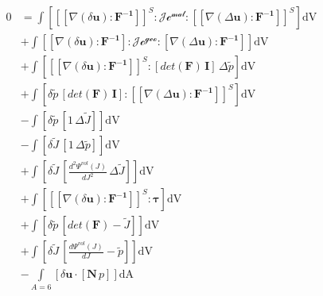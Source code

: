 \documentclass[preview,varwidth,multi,border=1pt]{standalone}
\begin{document}
\preview
$\begin{aligned}
0 &= \int\left[\left[\left[\nabla\left(\delta{\mathbf{u}}\right) \colon \mathbf{\mathbf{F}^{-1}}\right]\right]^{S} \colon \mathcal{J\mathcal{c}^{mat}} \colon \left[\left[\nabla\left(\Delta{\mathbf{u}}\right) \colon \mathbf{\mathbf{F}^{-1}}\right]\right]^{S}\right]\textrm{dV} \\
  &+ \int\left[\left[\nabla\left(\delta{\mathbf{u}}\right) \colon \mathbf{\mathbf{F}^{-1}}\right] \colon \mathcal{J\mathcal{c}^{geo}} \colon \left[\nabla\left(\Delta{\mathbf{u}}\right) \colon \mathbf{\mathbf{F}^{-1}}\right]\right]\textrm{dV} \\
  &+ \int\left[\left[\left[\nabla\left(\delta{\mathbf{u}}\right) \colon \mathbf{\mathbf{F}^{-1}}\right]\right]^{S} \colon \left[{det(\mathbf{F})}\,\mathbf{\mathbf{I}}\right]\,\Delta{\tilde{p}}\right]\textrm{dV} \\
  &+ \int\left[\delta{\tilde{p}}\,\left[{det(\mathbf{F})}\,\mathbf{\mathbf{I}}\right] \colon \left[\left[\nabla\left(\Delta{\mathbf{u}}\right) \colon \mathbf{\mathbf{F}^{-1}}\right]\right]^{S}\right]\textrm{dV} \\
  &- \int\left[\delta{\tilde{p}}\,\left[{1}\,\Delta{\tilde{J}}\right]\right]\textrm{dV} \\
  &- \int\left[\delta{\tilde{J}}\,\left[{1}\,\Delta{\tilde{p}}\right]\right]\textrm{dV} \\
  &+ \int\left[\delta{\tilde{J}}\,\left[{\frac{d^{2} \Psi^{vol}(J)}{dJ^{2}}}\,\Delta{\tilde{J}}\right]\right]\textrm{dV} \\
  &+ \int\left[\left[\left[\nabla\left(\delta{\mathbf{u}}\right) \colon \mathbf{\mathbf{F}^{-1}}\right]\right]^{S} \colon \mathbf{\boldsymbol{\tau}}\right]\textrm{dV} \\
  &+ \int\left[\delta{\tilde{p}}\,\left[{det(\mathbf{F})} - {\tilde{J}}\right]\right]\textrm{dV} \\
  &+ \int\left[\delta{\tilde{J}}\,\left[{\frac{d \Psi^{vol}(J)}{dJ}} - {\tilde{p}}\right]\right]\textrm{dV} \\
  &- \int\limits_{A=6}\left[\delta{\mathbf{u}} \cdot \left[\mathbf{N}\,{p}\right]\right]\textrm{dA}
\end{aligned}$
\endpreview

\newpage
\end{document}
